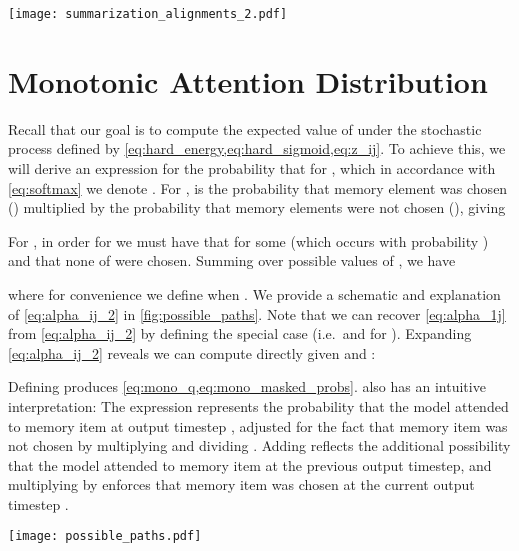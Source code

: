 \documentclass{article}
\begin{document}
\clearpage

\begin{figure*}[h]
\vskip 0.2in
\begin{center}
\centerline{\texttt{[image: summarization\_alignments\_2.pdf]}}
\caption{Additional example sentence-summary pair and attention alignment matrices for our hard monotonic model and the -based attention model of .
The ground-truth summary is ``china attacks us human rights''.}
\label{fig:summarization_alignments_2}
\end{center}
\vskip -0.4in
\end{figure*}

\section{Monotonic Attention Distribution}
\label{sec:mono_derivation}

Recall that our goal is to compute the expected value of  under the stochastic process defined by \cref{eq:hard_energy,eq:hard_sigmoid,eq:z_ij}.
To achieve this, we will derive an expression for the probability that  for , which in accordance with \cref{eq:softmax} we denote .
For ,  is the probability that memory element  was chosen () multiplied by the probability that memory elements  were not chosen (), giving

For , in order for  we must have that  for some  (which occurs with probability ) and that none of  were chosen.
Summing over possible values of , we have

where for convenience we define  when .
We provide a schematic and explanation of \cref{eq:alpha_ij_2} in \cref{fig:possible_paths}.
Note that we can recover \cref{eq:alpha_1j} from \cref{eq:alpha_ij_2} by defining the special case  (i.e.\  and  for ).
Expanding \cref{eq:alpha_ij_2} reveals we can compute  directly given  and :


Defining  produces \cref{eq:mono_q,eq:mono_masked_probs}.
 also has an intuitive interpretation:
The expression  represents the probability that the model attended to memory item  at output timestep , adjusted for the fact that memory item  was not chosen by multiplying  and dividing .
Adding  reflects the additional possibility that the model attended to memory item  at the previous output timestep, and multiplying by  enforces that memory item  was chosen at the current output timestep .

\begin{figure*}[t]
\vskip 0.2in
\begin{center}
\centerline{\texttt{[image: possible\_paths.pdf]}}
\caption{Visualization of \cref{eq:alpha_ij_2}.
In this example, we are showing the computation of .
Each grid shows each of the four terms in the summation, corresponding to the possibilities that we attended to memory item  at the previous output timestep .
Gray nodes with curved arrows represent the probability of not selecting to the th memory entry ().
The black nodes represent the possibility of attending to memory item  at timestep .}
\label{fig:possible_paths}
\end{center}
\vskip -0.4in
\end{figure*}
\end{document}
